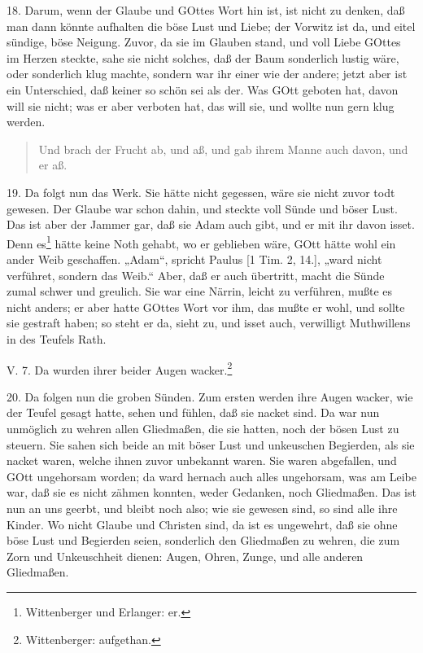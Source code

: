 18. Darum, wenn der Glaube und GOttes Wort hin ist, ist nicht zu denken, daß man dann könnte aufhalten die böse Lust und Liebe; der Vorwitz ist da, und eitel sündige, böse Neigung. Zuvor, da sie im Glauben stand, und voll Liebe GOttes im Herzen steckte, sahe sie nicht solches, daß der Baum sonderlich lustig wäre, oder sonderlich klug machte, sondern war ihr einer wie der andere; jetzt aber ist ein Unterschied, daß keiner so schön sei als der. Was GOtt geboten hat, davon will sie nicht; was er aber verboten hat, das will sie, und wollte nun gern klug werden.

\begin{quote}
Und brach der Frucht ab, und aß, und gab ihrem Manne auch davon, und er aß.
\end{quote}

19. Da folgt nun das Werk. Sie hätte nicht gegessen, wäre sie nicht zuvor todt gewesen. Der Glaube war schon dahin, und steckte voll Sünde und böser Lust. Das ist aber der Jammer gar, daß sie Adam auch gibt, und er mit ihr davon isset. Denn es\footnote{Wittenberger und Erlanger: er.} hätte keine Noth gehabt, wo er geblieben wäre, GOtt hätte wohl ein ander Weib geschaffen. „Adam“, spricht Paulus [1 Tim. 2, 14.], „ward nicht verführet, sondern das Weib.“ Aber, daß er auch übertritt, macht die Sünde zumal schwer und greulich. Sie war eine Närrin, leicht zu verführen, mußte es nicht anders; er aber hatte GOttes Wort vor ihm, das mußte er wohl, und sollte sie gestraft haben; so steht er da, sieht zu, und isset auch, verwilligt Muthwillens in des Teufels Rath.

\begin{schriftzitat}
V. 7. Da wurden ihrer beider Augen wacker.\footnote{Wittenberger: aufgethan.}
\end{schriftzitat}

20. Da folgen nun die groben Sünden. Zum ersten werden ihre Augen wacker, wie der Teufel gesagt hatte, sehen und fühlen, daß sie nacket sind. Da war nun unmöglich zu wehren allen Gliedmaßen, die sie hatten, noch der bösen Lust zu steuern. Sie sahen sich beide an mit böser Lust und unkeuschen Begierden, als sie nacket waren, welche ihnen zuvor unbekannt waren. Sie waren abgefallen, und GOtt ungehorsam worden; da ward hernach auch alles ungehorsam, was am Leibe war, daß sie es nicht zähmen konnten, weder Gedanken, noch Gliedmaßen. Das ist nun an uns geerbt, und bleibt noch also; wie sie gewesen sind, so sind alle ihre Kinder. Wo nicht Glaube und Christen sind, da ist es ungewehrt, daß sie ohne böse Lust und Begierden seien, sonderlich den Gliedmaßen zu wehren, die zum Zorn und Unkeuschheit dienen: Augen, Ohren, Zunge, und alle anderen Gliedmaßen.

